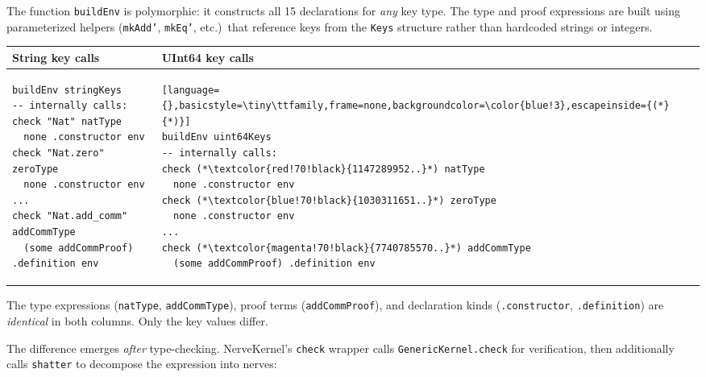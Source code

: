 The function \texttt{buildEnv} is polymorphic: it constructs all 15 declarations for \emph{any} key type.  The type and proof expressions are built using parameterized helpers (\texttt{mkAdd'}, \texttt{mkEq'}, etc.)\ that reference keys from the \texttt{Keys} structure rather than hardcoded strings or integers.

\begin{center}\small
\begin{tabular}{@{}p{}p{}@{}}
\toprule
\textbf{String key calls} & \textbf{UInt64 key calls} \\
\midrule
\begin{lstlisting}[language={},basicstyle=\tiny\ttfamily,frame=none,backgroundcolor=\color{green!3}]
buildEnv stringKeys
-- internally calls:
check "Nat" natType
  none .constructor env
check "Nat.zero" zeroType
  none .constructor env
...
check "Nat.add_comm" addCommType
  (some addCommProof) .definition env
\end{lstlisting}
&
\begin{lstlisting}[language={},basicstyle=\tiny\ttfamily,frame=none,backgroundcolor=\color{blue!3},escapeinside={(*}{*)}]
buildEnv uint64Keys
-- internally calls:
check (*\textcolor{red!70!black}{1147289952..}*) natType
  none .constructor env
check (*\textcolor{blue!70!black}{1030311651..}*) zeroType
  none .constructor env
...
check (*\textcolor{magenta!70!black}{7740785570..}*) addCommType
  (some addCommProof) .definition env
\end{lstlisting}
\\
\bottomrule
\end{tabular}
\end{center}

The type expressions (\texttt{natType}, \texttt{addCommType}), proof terms (\texttt{addCommProof}), and declaration kinds (\texttt{.constructor}, \texttt{.definition}) are \emph{identical} in both columns.  Only the key values differ.

The difference emerges \emph{after} type-checking.  NerveKernel's \texttt{check} wrapper calls \texttt{GenericKernel.check} for verification, then additionally calls \texttt{shatter} to decompose the expression into nerves:

